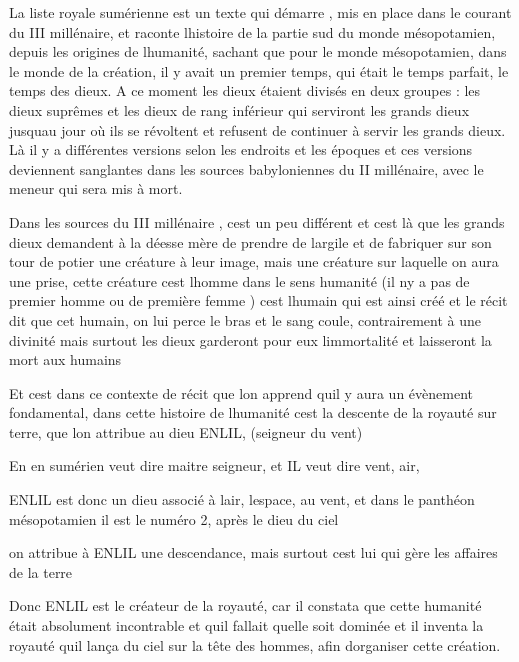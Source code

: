 \documentclass{article}
\begin{document}
La liste royale sumérienne est un texte qui démarre , mis en place dans
le courant du III millénaire, et raconte l{\textquotesingle}histoire de
la partie sud du monde mésopotamien, depuis les origines de
l{\textquotesingle}humanité, sachant que pour le monde mésopotamien,
dans le monde de la création, il y avait un premier temps, qui était le
temps parfait, le temps des dieux. A ce moment les dieux étaient
divisés en deux groupes : les dieux suprêmes et les dieux de rang
inférieur qui serviront les grands dieux jusqu{\textquotesingle}au jour
où ils se révoltent et refusent de continuer à servir les grands dieux.
Là il y a différentes versions selon les endroits et les époques et ces
versions deviennent sanglantes dans les sources babyloniennes du II
millénaire, avec le meneur qui sera mis à mort.

Dans les sources du III millénaire , c{\textquotesingle}est un peu
différent et c{\textquotesingle}est là que les grands dieux demandent à
la déesse mère de prendre de l{\textquotesingle}argile et de fabriquer
sur son tour de potier une créature à leur image, mais une créature sur
laquelle on aura une prise, cette créature c{\textquotesingle}est
l{\textquotesingle}homme dans le sens humanité (il n{\textquotesingle}y
a pas de premier homme ou de première femme ) c{\textquotesingle}est
l{\textquotesingle}humain qui est ainsi créé et le récit dit que cet
humain, on lui perce le bras et le sang coule, contrairement à une
divinité mais surtout les dieux garderont pour eux
l{\textquotesingle}immortalité et laisseront la mort aux humains

Et c{\textquotesingle}est dans ce contexte de récit que
l{\textquotesingle}on apprend qu{\textquotesingle}il y aura un
évènement fondamental, dans cette histoire de
l{\textquotesingle}humanité c{\textquotesingle}est la descente de la
royauté sur terre, que l{\textquotesingle}on attribue au dieu ENLIL,
(seigneur du vent)

En en sumérien veut dire maitre seigneur, et IL veut dire vent, air, 

ENLIL est donc un dieu associé à l{\textquotesingle}air,
l{\textquotesingle}espace, au vent, et dans le panthéon mésopotamien il
est le numéro 2, après le dieu du ciel

on attribue à ENLIL une descendance, mais surtout c{\textquotesingle}est
lui qui gère les affaires de la terre

Donc ENLIL est le créateur de la royauté, car il constata que cette
humanité était absolument incontrable et qu{\textquotesingle}il fallait
qu{\textquotesingle}elle soit dominée et il inventa la royauté
qu{\textquotesingle}il lança du ciel sur la tête des hommes, afin
d{\textquotesingle}organiser cette création. 
\end{document}

